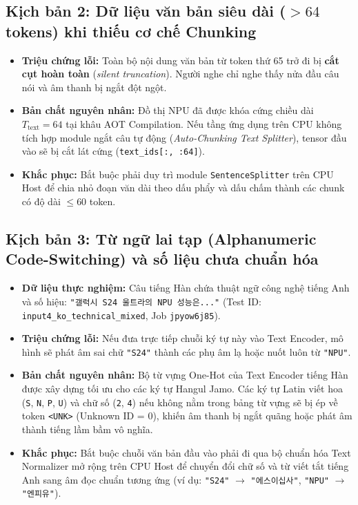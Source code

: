 \documentclass[11pt,a4paper,oneside,table]{report}
\begin{document}
\subsection{Kịch bản 2: Dữ liệu văn bản siêu dài ($> 64$ tokens) khi thiếu cơ chế Chunking}
\begin{itemize}
    \item \textbf{Triệu chứng lỗi:} Toàn bộ nội dung văn bản từ token thứ 65 trở đi bị \textbf{cắt cụt hoàn toàn} (\textit{silent truncation}). Người nghe chỉ nghe thấy nửa đầu câu nói và âm thanh bị ngắt đột ngột.
    \item \textbf{Bản chất nguyên nhân:} Đồ thị NPU đã được khóa cứng chiều dài $T_{\text{text}} = 64$ tại khâu AOT Compilation. Nếu tầng ứng dụng trên CPU không tích hợp module ngắt câu tự động (\textit{Auto-Chunking Text Splitter}), tensor đầu vào sẽ bị cắt lát cứng (\texttt{text\_ids[:, :64]}).
    \item \textbf{Khắc phục:} Bắt buộc phải duy trì module \texttt{SentenceSplitter} trên CPU Host để chia nhỏ đoạn văn dài theo dấu phẩy và dấu chấm thành các chunk có độ dài $\le 60$ token.
\end{itemize}

\subsection{Kịch bản 3: Từ ngữ lai tạp (Alphanumeric Code-Switching) và số liệu chưa chuẩn hóa}
\begin{itemize}
    \item \textbf{Dữ liệu thực nghiệm:} Câu tiếng Hàn chứa thuật ngữ công nghệ tiếng Anh và số hiệu: \texttt{"갤럭시 S24 울트라의 NPU 성능은..."} (Test ID: \texttt{input4\_ko\_technical\_mixed}, Job \texttt{jpyow6j85}).
    \item \textbf{Triệu chứng lỗi:} Nếu đưa trực tiếp chuỗi ký tự này vào Text Encoder, mô hình sẽ phát âm sai chữ \texttt{"S24"} thành các phụ âm lạ hoặc nuốt luôn từ \texttt{"NPU"}.
    \item \textbf{Bản chất nguyên nhân:} Bộ từ vựng One-Hot của Text Encoder tiếng Hàn được xây dựng tối ưu cho các ký tự Hangul Jamo. Các ký tự Latin viết hoa (\texttt{S}, \texttt{N}, \texttt{P}, \texttt{U}) và chữ số (\texttt{2}, \texttt{4}) nếu không nằm trong bảng từ vựng sẽ bị ép về token \texttt{<UNK>} (Unknown ID = 0), khiến âm thanh bị ngắt quãng hoặc phát âm thành tiếng lầm bầm vô nghĩa.
    \item \textbf{Khắc phục:} Bắt buộc chuỗi văn bản đầu vào phải đi qua bộ chuẩn hóa Text Normalizer mở rộng trên CPU Host để chuyển đổi chữ số và từ viết tắt tiếng Anh sang âm đọc chuẩn tương ứng (ví dụ: \texttt{"S24"} $\to$ \texttt{"에스이십사"}, \texttt{"NPU"} $\to$ \texttt{"엔피유"}).
\end{itemize}
\end{document}
